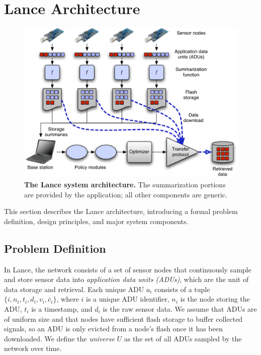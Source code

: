 \section{Lance Architecture}
\label{lance-sec-architecture}

\begin{figure}[t]
\begin{center}
\includegraphics[width=1.0\hsize]{./4-lance/figs/used/architecture.pdf}
\end{center}

\caption{\textbf{The Lance system architecture.} The summarization portions
are provided by the application; all other components are generic.}

\label{lance-fig-architecture}
\end{figure}

This section describes the Lance architecture, introducing a formal problem
definition, design principles, and major system components.

\subsection{Problem Definition}
\label{lance-sec-problem-definition}

In Lance, the network consists of a set of sensor nodes that continuously
sample and store sensor data into \textit{application data units (ADUs)},
which are the unit of data storage and retrieval. Each unique ADU $a_i$
consists of a tuple $\{ i, n_i, t_i, d_i, v_i, \bar{c}_i \}$, where $i$ is a
unique ADU identifier, $n_i$ is the node storing the ADU, $t_i$ is a
timestamp, and $d_i$ is the raw sensor data. We assume that ADUs are of
uniform size and that nodes have sufficient flash storage to buffer collected
signals, so an ADU is only evicted from a node's flash once it has been
downloaded. We define the \textit{universe} $U$ as the set of all ADUs
sampled by the network over time. 

